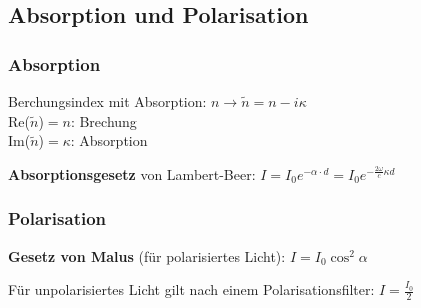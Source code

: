 \documentclass[german]{latex4ei/latex4ei_sheet}
\begin{document}
\begin{sectionbox}
\subsection{Absorption und Polarisation}

\subsubsection{Absorption}
Berchungsindex mit Absorption: $n\rightarrow \tilde{n}=n-i\kappa$\\ 
Re($\tilde{n}$)$=n$: Brechung \\
Im($\tilde{n}$)$=\kappa$: Absorption \\
\begin{emphbox}
\textbf{Absorptionsgesetz} von Lambert-Beer: $I=I_0e^{-\alpha \cdot d}=I_0e^{-\frac{2\omega}{c}\kappa d}$
\end{emphbox}
\subsubsection{Polarisation}
\begin{emphbox}
\textbf{Gesetz von Malus} (für polarisiertes Licht): $I = I_0 \cos^2 \alpha$
\end{emphbox}
Für unpolarisiertes Licht gilt nach einem Polarisationsfilter: $I = \frac{I_0}{2}$

\end{sectionbox}

\end{document}
